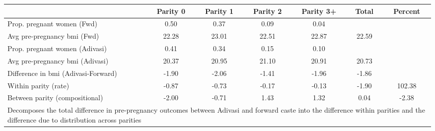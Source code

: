 \begin{tabular}{l*{6}{c}}
\toprule
            &\multicolumn{1}{c}{Parity 0}&\multicolumn{1}{c}{Parity 1}&\multicolumn{1}{c}{Parity 2}&\multicolumn{1}{c}{Parity 3+}&\multicolumn{1}{c}{Total}&\multicolumn{1}{c}{Percent}\\
\midrule
\midrule
Prop. pregnant women (Fwd)&        0.50&        0.37&        0.09&        0.04&            &            \\
Avg pre-pregnancy bmi (Fwd)&       22.28&       23.01&       22.51&       22.87&       22.59&            \\
Prop. pregnant women (Adivasi)&        0.41&        0.34&        0.15&        0.10&            &            \\
Avg pre-pregnancy bmi (Adivasi)&       20.37&       20.95&       21.10&       20.91&       20.73&            \\
Difference in bmi (Adivasi-Forward)&       -1.90&       -2.06&       -1.41&       -1.96&       -1.86&            \\
Within parity (rate)&       -0.87&       -0.73&       -0.17&       -0.13&       -1.90&      102.38\\
Between parity (compositional)&       -2.00&       -0.71&        1.43&        1.32&        0.04&       -2.38\\
\bottomrule
\multicolumn{7}{l}{\footnotesize Decomposes the total difference in pre-pregnancy outcomes between Adivasi and forward caste into the difference within parities and the difference due to distribution across parities}\\
\end{tabular}
